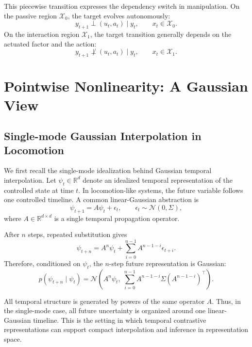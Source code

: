 This piecewise transition expresses the dependency switch in manipulation. On the passive region \(\mathcal X_0\), the target evolves autonomously:
\begin{equation}
y_{t+1}\perp (u_t,a_t)\mid y_t,
\qquad x_t\in\mathcal X_0.
\end{equation}
On the interaction region \(\mathcal X_1\), the target transition generally depends on the actuated factor and the action:
\begin{equation}
y_{t+1}\not\perp (u_t,a_t)\mid y_t,
\qquad x_t\in\mathcal X_1.
\end{equation}


\section{Pointwise Nonlinearity: A Gaussian View}

\subsection{Single-mode Gaussian Interpolation in Locomotion}

We first recall the single-mode idealization behind Gaussian temporal interpolation. Let \(\psi_t\in\mathbb R^d\) denote an idealized temporal representation of the controlled state at time \(t\). In locomotion-like systems, the future variable follows one controlled timeline. A common linear-Gaussian abstraction is
\begin{equation}
\psi_{t+1}
=
A\psi_t+\epsilon_t,
\qquad
\epsilon_t\sim\mathcal N(0,\Sigma),
\end{equation}
where \(A\in\mathbb R^{d\times d}\) is a single temporal propagation operator.

After \(n\) steps, repeated substitution gives
\begin{equation}
\psi_{t+n}
=
A^n\psi_t
+
\sum_{i=0}^{n-1}
A^{n-1-i}\epsilon_{t+i}.
\end{equation}
Therefore, conditioned on \(\psi_t\), the \(n\)-step future representation is Gaussian:
\begin{equation}
p(\psi_{t+n}\mid \psi_t)
=
\mathcal N
\left(
A^n\psi_t,\;
\sum_{i=0}^{n-1}
A^{n-1-i}\Sigma(A^{n-1-i})^\top
\right).
\end{equation}

All temporal structure is generated by powers of the same operator \(A\). Thus, in the single-mode case, all future uncertainty is organized around one linear-Gaussian timeline. This is the setting in which temporal contrastive representations can support compact interpolation and inference in representation space. 

